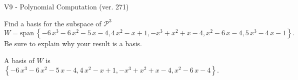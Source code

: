 \begin{exercise}
  \begin{exerciseTitle}V9 - Polynomial Computation (ver. 271)\end{exerciseTitle}
  \begin{exerciseStatement}
    Find a basis for the subspace of \(\mathcal{P}^3\) 
\[W=\mathrm{span}\ \left\{-6 \, x^{3} - 6 \, x^{2} - 5 \, x - 4 , 4 \, x^{2} - x + 1 , -x^{3} + x^{2} + x - 4 , x^{2} - 6 \, x - 4 , 5 \, x^{3} - 4 \, x - 1\right\}.\]
 Be sure to explain why your result is a basis.


  \end{exerciseStatement}
  \begin{exerciseAnswer}
   A basis of \(W\) is  \(\left\{-6 \, x^{3} - 6 \, x^{2} - 5 \, x - 4 , 4 \, x^{2} - x + 1 , -x^{3} + x^{2} + x - 4 , x^{2} - 6 \, x - 4\right\}\).
  


  \end{exerciseAnswer}
\end{exercise}